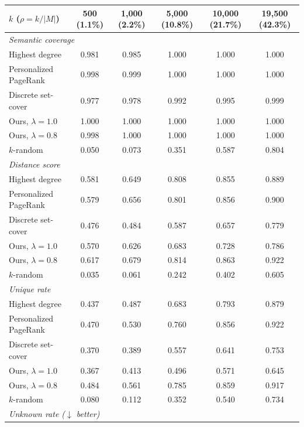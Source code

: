 \begin{table}[h]
\centering
\footnotesize
\begin{tabular}{lccccc}
\toprule
$k$ ($\rho = k/|M|$) & 500 (1.1\%) & 1{,}000 (2.2\%) & 5{,}000 (10.8\%) & 10{,}000 (21.7\%) & 19{,}500 (42.3\%) \\
\midrule
\multicolumn{6}{l}{\textit{Semantic coverage}} \\
Highest degree            & 0.981 & 0.985 & 1.000 & 1.000 & 1.000 \\
Personalized PageRank     & 0.998 & 0.999 & 1.000 & 1.000 & 1.000 \\
Discrete set-cover        & 0.977 & 0.978 & 0.992 & 0.995 & 0.999 \\
Ours, $\lambda=1.0$       & 1.000 & 1.000 & 1.000 & 1.000 & 1.000 \\
Ours, $\lambda=0.8$       & 0.998 & 1.000 & 1.000 & 1.000 & 1.000 \\
$k$-random                & 0.050 & 0.073 & 0.351 & 0.587 & 0.804 \\
\midrule
\multicolumn{6}{l}{\textit{Distance score}} \\
Highest degree            & 0.581 & 0.649 & 0.808 & 0.855 & 0.889 \\
Personalized PageRank     & 0.579 & 0.656 & 0.801 & 0.856 & 0.900 \\
Discrete set-cover        & 0.476 & 0.484 & 0.587 & 0.657 & 0.779 \\
Ours, $\lambda=1.0$       & 0.570 & 0.626 & 0.683 & 0.728 & 0.786 \\
Ours, $\lambda=0.8$       & 0.617 & 0.679 & 0.814 & 0.863 & 0.922 \\
$k$-random                & 0.035 & 0.061 & 0.242 & 0.402 & 0.605 \\
\midrule
\multicolumn{6}{l}{\textit{Unique rate}} \\
Highest degree            & 0.437 & 0.487 & 0.683 & 0.793 & 0.879 \\
Personalized PageRank     & 0.470 & 0.530 & 0.760 & 0.856 & 0.922 \\
Discrete set-cover        & 0.370 & 0.389 & 0.557 & 0.641 & 0.753 \\
Ours, $\lambda=1.0$       & 0.367 & 0.413 & 0.496 & 0.571 & 0.645 \\
Ours, $\lambda=0.8$       & 0.484 & 0.561 & 0.785 & 0.859 & 0.917 \\
$k$-random                & 0.080 & 0.112 & 0.352 & 0.540 & 0.734 \\
\midrule
\multicolumn{6}{l}{\textit{Unknown rate ($\downarrow$ better)}} \\

\end{tabular}
\end{table}
